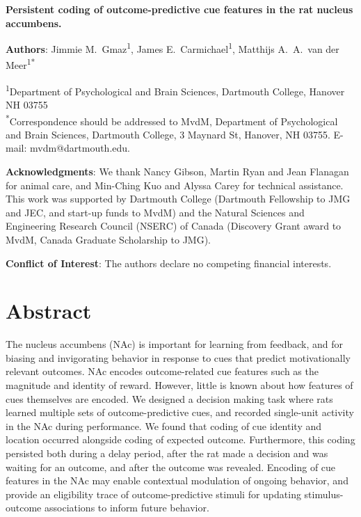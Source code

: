\documentclass[11pt]{article}
\begin{document}
\renewcommand{\BBAB}{\BBAA}
\renewcommand{\APACrefYearMonthDay}[3]{\APACrefYear{#1}}

{\Large\bf Persistent coding of outcome-predictive cue features in the
  rat nucleus accumbens.}

{\bf Authors}: Jimmie M.\ Gmaz\textsuperscript{1}, James
E.\ Carmichael\textsuperscript{1}, Matthijs A.\ A.\ van der
Meer\textsuperscript{1*}

\textsuperscript{1}Department of Psychological and Brain Sciences,
Dartmouth College, Hanover NH
03755\\ 

\textsuperscript{*}Correspondence should be addressed to MvdM,
Department of Psychological and Brain Sciences, Dartmouth College, 3
Maynard St, Hanover, NH 03755. E-mail: {\sffamily mvdm@dartmouth.edu}.

\textbf{Acknowledgments}: We thank Nancy Gibson, Martin Ryan and Jean
Flanagan for animal care, and Min-Ching Kuo and
Alyssa Carey for technical assistance. This work was supported by
Dartmouth College (Dartmouth Fellowship to JMG and JEC, and start-up funds to
MvdM) and the Natural Sciences and Engineering Research Council
(NSERC) of Canada (Discovery Grant award to MvdM, Canada Graduate
Scholarship to JMG).

\textbf{Conflict of Interest}: The authors declare no competing
financial interests.\\

\newpage
\linenumbers

\section*{Abstract}

The nucleus accumbens (NAc) is important for learning from feedback,
and for biasing and invigorating behavior in response to cues that
predict motivationally relevant outcomes. NAc encodes outcome-related
cue features such as the magnitude and identity of reward. However,
little is known about how features of cues themselves are encoded.
We designed a decision making task where rats learned multiple sets of
outcome-predictive cues, and recorded single-unit activity in the NAc
during performance. We found that coding of cue identity and location
occurred alongside coding of expected outcome. Furthermore, this
coding persisted both during a delay period, after the rat made a
decision and was waiting for an outcome, and after the outcome was
revealed. Encoding of cue features in the NAc may enable contextual
modulation of ongoing behavior, and provide an eligibility trace of
outcome-predictive stimuli for updating stimulus-outcome associations
to inform future behavior.
\end{document}
